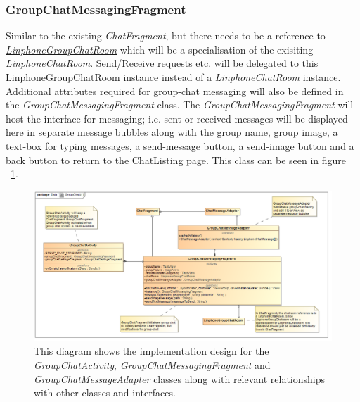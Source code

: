 \documentclass[11pt]{article}
\begin{document}
\subsubsection{GroupChatMessagingFragment}
Similar to the existing \textit{ChatFragment}, but there needs to be a reference to \textit{ \hyperref[subsubsec: linphonegroupchatroom]{LinphoneGroupChatRoom}} which will be a specialisation of the exisiting \textit{LinphoneChatRoom}. Send/Receive requests etc. will be delegated to this LinphoneGroupChatRoom instance instead of a \textit{LinphoneChatRoom} instance. Additional attributes required for group-chat messaging will also be defined in the \textit{GroupChatMessagingFragment} class. 
The \textit{GroupChatMessagingFragment} will host the interface for messaging; i.e. sent or received messages will be displayed here in separate message bubbles along with the group name, group image, a text-box for typing messages, a send-message button, a send-image button and a back button to return to the ChatListing page.
This class can be seen in figure ~\ref{cd-group-chat-messaging-ui}.
\begin{figure}[H]
\centering
\includegraphics[width=5in]{./images/class_group_chat_messaging_ui.png}
\caption[Android Group Chat Messaging UI Class Diagram]{This diagram shows the implementation design for the \textit{GroupChatActivity}, \textit{GroupChatMessagingFragment} and \textit{GroupChatMessageAdapter} classes along with relevant relationships with other classes and interfaces.}
\label{cd-group-chat-messaging-ui}
\end{figure}
\end{document}
